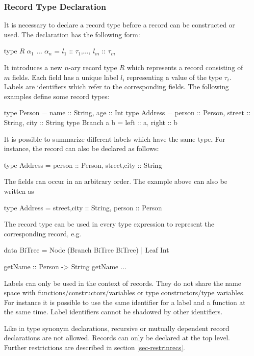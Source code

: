 \subsubsection{Record Type Declaration}
\label{sec-recordtypedecl}

It is necessary to declare a record type before a record
can be constructed or used. The declaration has the following form:
\begin{curry}
type $R$ $\alpha_1$ $\ldots$ $\alpha_n$ = { $l_1$ :: $\tau_1$,$\ldots$, $l_m$ :: $\tau_m$ }
\end{curry}
It introduces a new $n$-ary record type $R$ which represents a
record consisting of $m$ fields. Each field has a unique label $l_i$
representing a value of the type $\tau_i$. Labels
are identifiers which refer to the corresponding
fields. The following examples define some record types:
\begin{curry}
type Person = {name :: String, age :: Int}
type Address = {person :: Person, street :: String, city :: String}
type Branch a b = {left :: a, right :: b}
\end{curry}
It is possible to summarize different labels which have the same
type. For instance, the record  can also be declared as follows:
\begin{curry}
type Address = {person :: Person, street,city :: String}
\end{curry}
The fields can occur in an arbitrary order. The example above
can also be written as
\begin{curry}
type Address = {street,city :: String, person :: Person}
\end{curry}
The record type can be used in every type expression to represent
the corresponding record, e.g.
\begin{curry}
data BiTree = Node (Branch BiTree BiTree) | Leaf Int
\end{curry}
\begin{curry}
getName :: Person -> String
getName $\ldots$
\end{curry}

Labels can only be used in the context of
records. They do not share the name space with
functions/constructors/variables or type constructors/type variables.
For instance it is possible to use
the same identifier for a label and a function at the same time. Label
identifiers cannot be shadowed by other identifiers.

Like in type synonym declarations, recursive or mutually
dependent record declarations are not allowed. Records can only
be declared at the top level. Further restrictions are described in
section \ref{sec-restrinrecs}.


